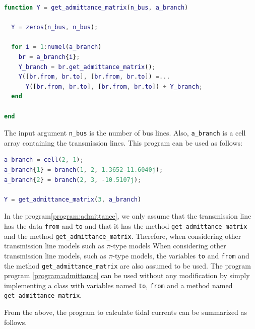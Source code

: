 \documentclass[graybox, envcountchap]{svmult}
\begin{document}
\begin{example}
\begin{lstlisting}[language=Matlab, caption=get\_admittance\_matrix.m, label={program:admittance}]
function Y = get_admittance_matrix(n_bus, a_branch)

  Y = zeros(n_bus, n_bus);

  for i = 1:numel(a_branch)
    br = a_branch{i};
    Y_branch = br.get_admittance_matrix();
    Y([br.from, br.to], [br.from, br.to]) =...
      Y([br.from, br.to], [br.from, br.to]) + Y_branch;
  end

end
\end{lstlisting}

The input argument \verb|n_bus| is the number of bus lines. Also,
\verb|a_branch| is a cell array containing the transmission lines. This program
can be used as follows:

\begin{lstlisting}[language=Matlab, caption=main\_admittance\_matrix.m, label={program:main_admittance}]
a_branch = cell(2, 1);
a_branch{1} = branch(1, 2, 1.3652-11.6040j);
a_branch{2} = branch(2, 3, -10.5107j);

Y = get_admittance_matrix(3, a_branch)
\end{lstlisting}

In the program\nobreak\ref{program:admittance}, we only assume that the
transmission line has the data \verb|from| and \verb|to| and that it has the
method \verb|get_admittance_matrix| and the method \verb|get_admittance_matrix|.
Therefore, when considering other transmission line models such as $\pi$-type
models When considering other transmission line models, such as $\pi$-type
models, the variables \verb|to| and \verb|from| and the method
\verb|get_admittance_matrix| are also assumed to be used. The program program
\nobreak\ref{program:admittance} can be used without any modification by simply
implementing a class with variables named \verb|to|, \verb|from| and a method
named \verb|get_admittance_matrix|.
\end{example}

From the above, the program to calculate tidal currents can be summarized as follows.
\end{document}
